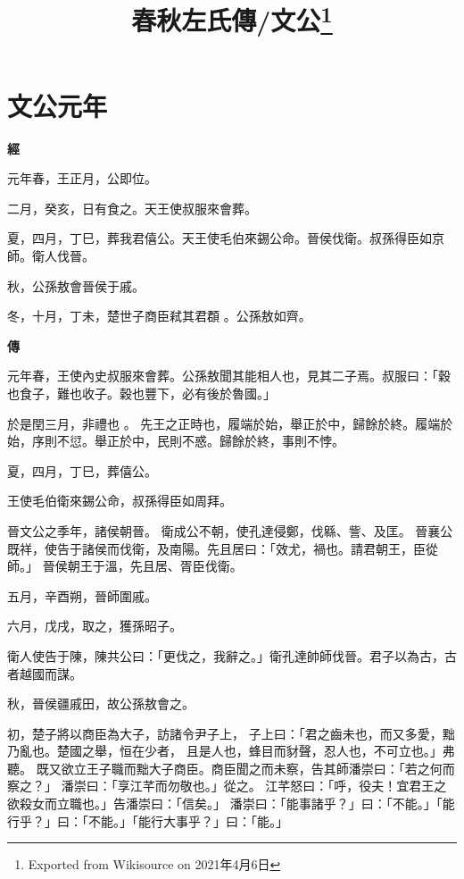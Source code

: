 \documentclass{ctexart}
\title{春秋左氏傳/文公\footnote{Exported from Wikisource on 2021年4月6日}}
\begin{document}
\maketitle









\section{文公元年}





\textbf{經}



元年春，王正月，公即位。

二月，癸亥，日有食之。天王使叔服來會葬。

夏，四月，丁巳，葬我君僖公。天王使毛伯來錫公命。晉侯伐衛。叔孫得臣如京師。衛人伐晉。

秋，公孫敖會晉侯于戚。

冬，十月，丁未，楚世子商臣弒其君頵 。公孫敖如齊。

\textbf{傳}



元年春，王使內史叔服來會葬。公孫敖聞其能相人也，見其二子焉。叔服曰：「穀也食子，難也收子。穀也豐下，必有後於魯國。」

於是閏三月，非禮也 。
先王之正時也，履端於始，舉正於中，歸餘於終。履端於始，序則不愆。舉正於中，民則不惑。歸餘於終，事則不悖。

夏，四月，丁巳，葬僖公。

王使毛伯衛來錫公命，叔孫得臣如周拜。

晉文公之季年，諸侯朝晉。
衛成公不朝，使孔達侵鄭，伐緜、訾、及匡。
晉襄公既祥，使告于諸侯而伐衛，及南陽。先且居曰：「效尤，禍也。請君朝王，臣從師。」
晉侯朝王于溫，先且居、胥臣伐衛。

五月，辛酉朔，晉師圍戚。

六月，戊戌，取之，獲孫昭子。

衛人使告于陳，陳共公曰：「更伐之，我辭之。」衛孔達帥師伐晉。君子以為古，古者越國而謀。

秋，晉侯疆戚田，故公孫敖會之。

初，楚子將以商臣為大子，訪諸令尹子上，
子上曰：「君之齒未也，而又多愛，黜乃亂也。楚國之舉，恒在少者，
且是人也，蜂目而豺聲，忍人也，不可立也。」弗聽。
既又欲立王子職而黜大子商臣。商臣聞之而未察，告其師潘崇曰：「若之何而察之？」
潘崇曰：「享江芊而勿敬也。」從之。
江芊怒曰：「呼，役夫！宜君王之欲殺女而立職也。」告潘崇曰：「信矣。」
潘崇曰：「能事諸乎？」曰：「不能。」「能行乎？」曰：「不能。」「能行大事乎？」曰：「能。」
\end{document}
